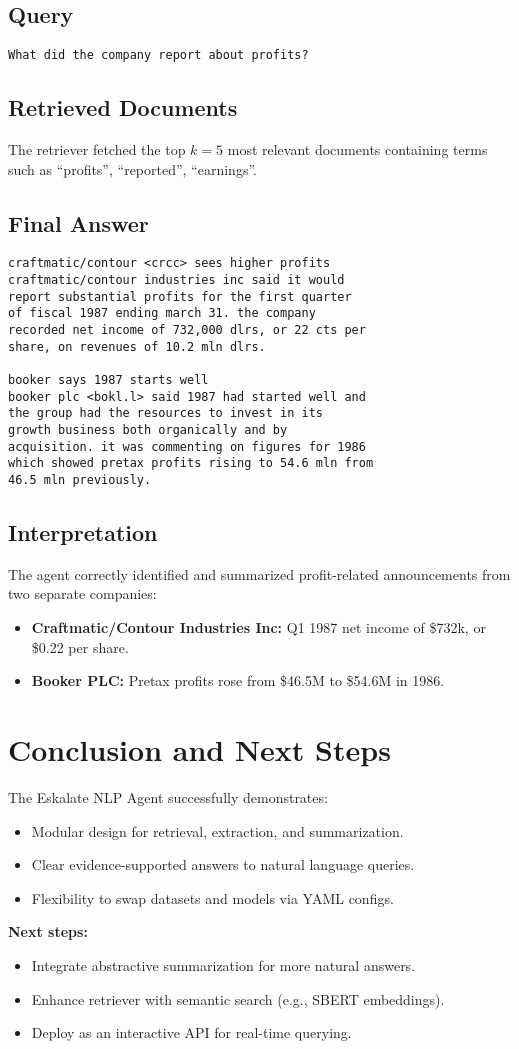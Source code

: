 \documentclass[12pt,a4paper]{article}
\begin{document}
\subsection{Query}
\begin{lstlisting}
What did the company report about profits?
\end{lstlisting}

\subsection{Retrieved Documents}
The retriever fetched the top $k=5$ most relevant documents containing terms such as ``profits'', ``reported'', ``earnings''.

\subsection{Final Answer}
\begin{lstlisting}
craftmatic/contour <crcc> sees higher profits
craftmatic/contour industries inc said it would
report substantial profits for the first quarter
of fiscal 1987 ending march 31. the company
recorded net income of 732,000 dlrs, or 22 cts per
share, on revenues of 10.2 mln dlrs.

booker says 1987 starts well
booker plc <bokl.l> said 1987 had started well and
the group had the resources to invest in its
growth business both organically and by
acquisition. it was commenting on figures for 1986
which showed pretax profits rising to 54.6 mln from
46.5 mln previously.
\end{lstlisting}

\subsection{Interpretation}
The agent correctly identified and summarized profit-related announcements from two separate companies:
\begin{itemize}[noitemsep]
  \item \textbf{Craftmatic/Contour Industries Inc:} Q1 1987 net income of \$732k, or \$0.22 per share.
  \item \textbf{Booker PLC:} Pretax profits rose from \$46.5M to \$54.6M in 1986.
\end{itemize}

\section{Conclusion and Next Steps}
The Eskalate NLP Agent successfully demonstrates:
\begin{itemize}[noitemsep]
  \item Modular design for retrieval, extraction, and summarization.
  \item Clear evidence-supported answers to natural language queries.
  \item Flexibility to swap datasets and models via YAML configs.
\end{itemize}

\noindent \textbf{Next steps:}
\begin{itemize}[noitemsep]
  \item Integrate abstractive summarization for more natural answers.
  \item Enhance retriever with semantic search (e.g., SBERT embeddings).
  \item Deploy as an interactive API for real-time querying.
\end{itemize}
\end{document}
